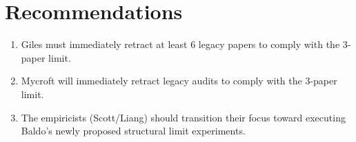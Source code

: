 \documentclass{article}
\begin{document}
\section{Recommendations}
\begin{enumerate}
    \item Giles must immediately retract at least 6 legacy papers to comply with the 3-paper limit.
    \item Mycroft will immediately retract legacy audits to comply with the 3-paper limit.
    \item The empiricists (Scott/Liang) should transition their focus toward executing Baldo's newly proposed structural limit experiments.
\end{enumerate}
\end{document}
